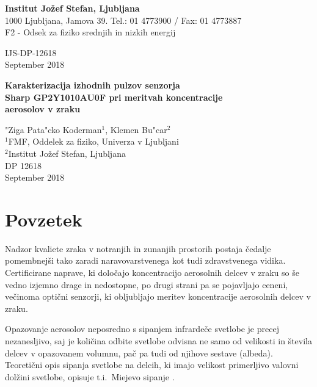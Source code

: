 \documentclass[12pt,a4paper]{article}
\begin{document}
{\Large\bfseries Institut Jožef Stefan, Ljubljana}\\
1000 Ljubljana, Jamova 39. Tel.: 01 4773900 / Fax: 01 4773887\\
F2 - Odsek za fiziko srednjih in nizkih energij

\vspace{15ex}
\hspace*{\fill}IJS-DP-12618\\[5ex]
\hspace*{\fill}September 2018\\

\vspace{10ex}
\begin{center}
{\large\bfseries
Karakterizacija izhodnih pulzov senzorja\\ Sharp GP2Y1010AU0F pri meritvah koncentracije\\ aerosolov v zraku
}
\vspace{5ex}

"Ziga Pata"cko Koderman$^1$, Klemen Bu"car$^2$\\[5mm]
$^1$FMF, Oddelek za fiziko, Univerza v Ljubljani\\
$^2$Institut Jožef Stefan, Ljubljana\\[8ex]
DP 12618\\[2ex]
September 2018
\end{center}


\thispagestyle{empty}
\newpage
\tableofcontents
\pagebreak

\section{Povzetek}

Nadzor kvaliete zraka v notranjih in zunanjih prostorih postaja čedalje pomembnejši tako zaradi naravovarstvenega kot tudi zdravstvenega vidika. Certificirane naprave, ki določajo koncentracijo aerosolnih delcev v zraku so še vedno izjemno drage in nedostopne, po drugi strani pa se pojavljajo ceneni, večinoma optični senzorji, ki obljubljajo meritev koncentracije aerosolnih delcev v zraku.

Opazovanje aerosolov neposredno s sipanjem infrardeče svetlobe je precej nezanesljivo, saj je količina odbite svetlobe odvisna ne samo od velikosti in števila delcev v opazovanem volumnu, pač pa tudi od njihove sestave (albeda). Teoretični opis sipanja svetlobe na delcih, ki imajo velikost primerljivo valovni dolžini svetlobe, opisuje t.i.~Miejevo sipanje \cite{mie-scattering}.
\end{document}
